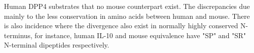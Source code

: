 Human DPP4 substrates that no mouse counterpart exist. The discrepancies due mainly to the less conservation in amino acids between human and mouse. There is also incidence where the divergence also exist in normally highly conserved N-terminus, for instance, human IL-10 and mouse equivalence have "SP" and "SR" N-terminal dipeptides respectively. 